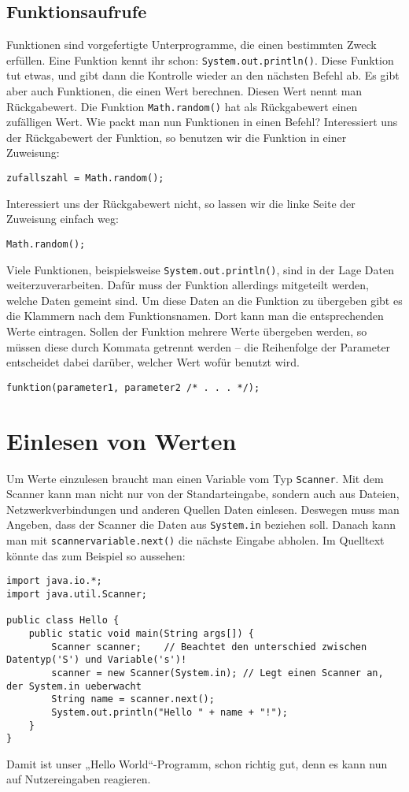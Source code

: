 \subsection{Funktionsaufrufe}
Funktionen sind vorgefertigte Unterprogramme, die einen bestimmten Zweck erfüllen. Eine Funktion kennt ihr schon: \lstinline$System.out.println()$.
Diese Funktion tut etwas, und gibt dann die Kontrolle wieder an den nächsten Befehl ab. Es gibt aber auch Funktionen, die einen Wert berechnen.
Diesen Wert nennt man Rückgabewert. Die Funktion \lstinline$Math.random()$ hat als Rückgabewert einen zufälligen Wert.
Wie packt man nun Funktionen in einen Befehl? Interessiert uns der Rückgabewert der Funktion, so benutzen wir die Funktion in einer Zuweisung: 
\begin{lstlisting}
zufallszahl = Math.random();
\end{lstlisting}
Interessiert uns der Rückgabewert nicht, so lassen wir die linke Seite der Zuweisung einfach weg:
\begin{lstlisting}
Math.random();
\end{lstlisting}
Viele Funktionen, beispielsweise \lstinline$System.out.println()$, sind in der Lage Daten weiterzuverarbeiten. Dafür muss der Funktion allerdings mitgeteilt werden, welche Daten gemeint sind.
Um diese Daten an die Funktion zu übergeben gibt es die Klammern nach dem Funktionsnamen. Dort kann man die entsprechenden Werte eintragen.
Sollen der Funktion mehrere Werte übergeben werden, so müssen diese durch Kommata getrennt werden – die Reihenfolge der Parameter entscheidet dabei darüber, welcher Wert wofür benutzt wird.
\begin{lstlisting}
funktion(parameter1, parameter2 /* . . . */);
\end{lstlisting}

\section {Einlesen von Werten}
Um Werte einzulesen braucht man einen Variable vom Typ \lstinline$Scanner$. Mit dem Scanner kann man nicht nur von der Standarteingabe, sondern auch aus Dateien, Netzwerkverbindungen und anderen Quellen Daten einlesen. 
Deswegen muss man Angeben, dass der Scanner die Daten aus \lstinline$System.in$ beziehen soll.
Danach kann man mit \lstinline$scannervariable.next()$ die nächste Eingabe abholen. Im Quelltext könnte das zum Beispiel so aussehen:
\begin{lstlisting}
import java.io.*;
import java.util.Scanner;

public class Hello {
	public static void main(String args[]) {
		Scanner scanner;	// Beachtet den unterschied zwischen Datentyp('S') und Variable('s')!
		scanner = new Scanner(System.in); // Legt einen Scanner an, der System.in ueberwacht
		String name = scanner.next();
		System.out.println("Hello " + name + "!");
	}
}
\end{lstlisting}
Damit ist unser „Hello World“-Programm, schon richtig gut, denn es kann nun auf Nutzereingaben reagieren.

